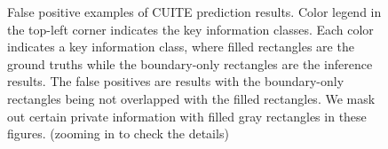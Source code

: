 \documentclass[10pt,twocolumn,letterpaper]{article}
\begin{document}
\begin{figure}
\begin{center}
\end{center}
   \caption{False positive examples of CUITE prediction results. Color legend in the top-left corner indicates the key information classes. Each color indicates a key information class, where filled rectangles are the ground truths while the boundary-only rectangles are the inference results. The false positives are results with the boundary-only rectangles being not overlapped with the filled rectangles. We mask out certain private information with filled gray rectangles in these figures. (zooming in to check the details)}
\label{fig:falsepositive}
\end{figure}
\end{document}
